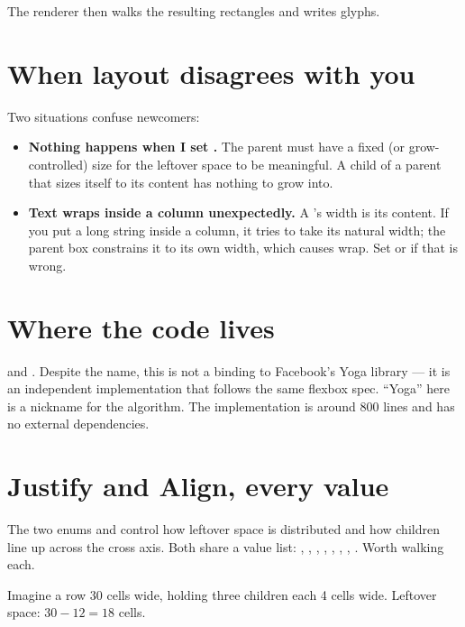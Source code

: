 The renderer then walks the resulting rectangles and writes glyphs.

\section{When layout disagrees with you}

Two situations confuse newcomers:

\begin{itemize}[leftmargin=*]
  \item \textbf{Nothing happens when I set .} The parent
    must have a fixed (or grow-controlled) size for the leftover
    space to be meaningful. A  child of a parent that
    sizes itself to its content has nothing to grow into.
  \item \textbf{Text wraps inside a column unexpectedly.} A
    's width is its content. If you put a long
    string inside a column, it tries to take its natural width; the
    parent box constrains it to its own width, which causes wrap.
    Set  or  if that is
    wrong.
\end{itemize}

\section{Where the code lives}

 and
. Despite the name, this is not a
binding to Facebook's Yoga library --- it is an independent
implementation that follows the same flexbox spec. ``Yoga'' here is a
nickname for the algorithm. The implementation is around 800 lines
and has no external dependencies.

\section{Justify and Align, every value}
\label{sec:layout:justify-align}

The two enums  and  control how leftover
space is distributed and how children line up across the cross axis.
Both share a value list: , , ,
, , ,
, . Worth walking each.

Imagine a row 30 cells wide, holding three children each 4 cells
wide. Leftover space: $30 - 12 = 18$ cells.

